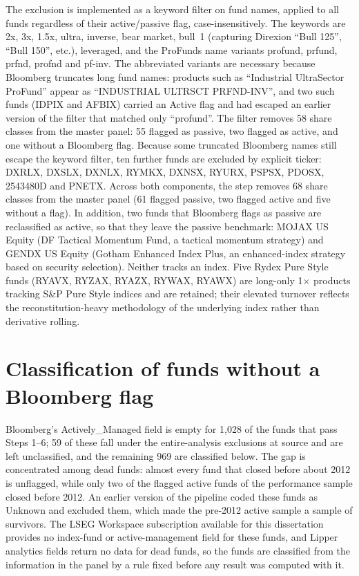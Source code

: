\documentclass[12pt, oneside]{report}
\begin{document}
The exclusion is implemented as a keyword filter on fund names, applied
to all funds regardless of their active/passive flag, case-insensitively.
The keywords are 2x, 3x, 1.5x, ultra, inverse, bear market, bull~1
(capturing Direxion ``Bull 125'', ``Bull 150'', etc.), leveraged, and the
ProFunds name variants profund, prfund, prfnd, profnd and pf-inv. The
abbreviated variants are necessary because Bloomberg truncates long fund
names: products such as ``Industrial UltraSector ProFund'' appear as
``INDUSTRIAL ULTRSCT PRFND-INV'', and two such funds (IDPIX and AFBIX)
carried an Active flag and had escaped an earlier version of the filter
that matched only ``profund''. The filter removes 58 share classes from
the master panel: 55 flagged as passive, two flagged as active, and one
without a Bloomberg flag. Because some truncated Bloomberg names still escape the
keyword filter, ten further funds are excluded by explicit ticker:
DXRLX, DXSLX, DXNLX, RYMKX, DXNSX, RYURX, PSPSX, PDOSX, 2543480D and
PNETX. Across both components, the step removes 68 share classes from
the master panel (61 flagged passive, two flagged active and five
without a flag). In addition, two funds that Bloomberg flags as passive are
reclassified as active, so that they leave the passive benchmark:
MOJAX US Equity (DF Tactical Momentum Fund, a tactical momentum
strategy) and GENDX US Equity (Gotham Enhanced Index Plus, an
enhanced-index strategy based on security selection). Neither tracks
an index. Five Rydex Pure Style funds (RYAVX, RYZAX, RYAZX,
RYWAX, RYAWX) are long-only 1$\times$ products tracking S\&P Pure Style
indices and are retained; their elevated turnover reflects the
reconstitution-heavy methodology of the underlying index rather than
derivative rolling.

\section{Classification of funds without a Bloomberg flag}
\label{sec:a_unflagged}

\noindent Bloomberg's Actively\_Managed field is empty for 1{,}028 of the
funds that pass Steps 1--6; 59 of these fall under the entire-analysis
exclusions at source and are left unclassified, and the remaining 969 are
classified below. The gap is concentrated among dead
funds: almost every fund that closed before about 2012 is unflagged,
while only two of the flagged active funds of the performance sample
closed before 2012. An earlier version of the pipeline coded these funds
as Unknown and excluded them, which made the pre-2012 active sample a
sample of survivors. The LSEG Workspace subscription available for this
dissertation provides no index-fund or active-management field for these
funds, and Lipper analytics fields return no data for dead funds, so the
funds are classified from the information in the panel by a rule fixed
before any result was computed with it.
\end{document}
